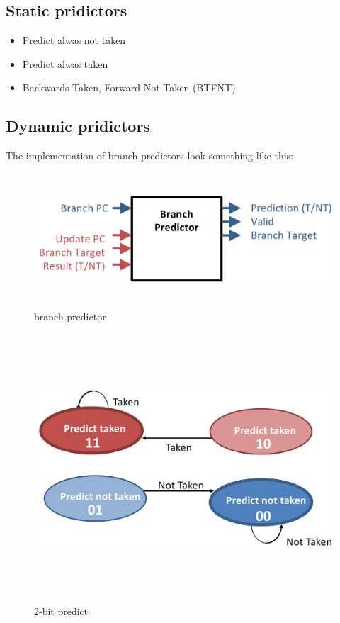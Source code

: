 \subsection{Static pridictors}
\begin{itemize}
\item  Predict alwas not taken
\item  Predict alwas taken
\item  Backwards-Taken, Forward-Not-Taken (BTFNT)
\end{itemize}


\newpage


\subsection{Dynamic pridictors}

The implementation of branch predictors look something like this:
\begin{figure}[h]
    \vspace{10mm}
    \centering
    \includegraphics[width=16cm, height=5cm]{image/branch-predictor.png} 
    \caption{branch-predictor}
\end{figure}


\begin{figure}[h]
    \vspace{10mm}
    \centering
    \includegraphics[width=16cm, height=10cm]{image/2-bit-predict.png} 
    \caption{2-bit predict}
\end{figure}


